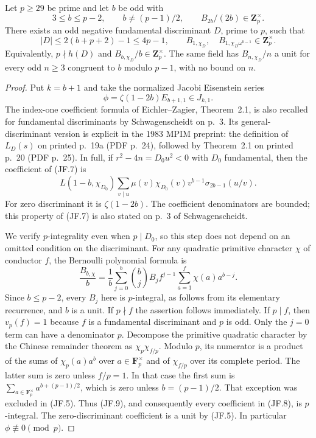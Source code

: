 \begin{theorem}
Let $p\geq29$ be prime and let $b$ be odd with
\[
 3\leq b\leq p-2,\qquad b\ne(p-1)/2,
 \qquad B_{2b}/(2b)\in\mathbf Z_p^\times.               \tag{JF.5}
\]
There exists an odd negative fundamental discriminant $D$, prime to
$p$, such that
\[
 |D|\leq2(b+p+2)-1\leq4p-1,\qquad
 B_{1,\chi_D},\quad B_{1,\chi_D\omega^{b-1}}
                      \in\mathbf Z_p^\times.           \tag{JF.6}
\]
Equivalently, $p\nmid h(D)$ and
$B_{b,\chi_D}/b\in\mathbf Z_p^\times$.
The same field has $B_{n,\chi_D}/n$ a unit for every odd $n\geq3$
congruent to $b$ modulo $p-1$, with no bound on $n$.
\end{theorem}
\begin{proof}
Put $k=b+1$ and take the normalized Jacobi Eisenstein series
\[
                \phi=\zeta(1-2b)E_{b+1,1}\in J_{k,1}.
                                                               \tag{JF.7}
\]
The index-one coefficient formula of Eichler--Zagier, Theorem~2.1,
is also recalled for fundamental discriminants by Schwagenscheidt
on p.~3.  Its general-discriminant version is explicit in the
1983 MPIM preprint: the definition of $L_D(s)$ on printed p.~19a
(PDF p.~24), followed by Theorem~2.1 on printed p.~20 (PDF p.~25).
In full, if $r^2-4n=D_0u^2<0$ with $D_0$ fundamental,
then the coefficient of (JF.7) is
\[
 L(1-b,\chi_{D_0})
 \sum_{v\mid u}\mu(v)\chi_{D_0}(v)v^{b-1}
                      \sigma_{2b-1}(u/v).               \tag{JF.8}
\]
For zero discriminant it is $\zeta(1-2b)$.
The coefficient denominators are bounded; this property of (JF.7)
is also stated on p.~3 of Schwagenscheidt.

We verify $p$-integrality even when $p\mid D_0$, so this step does
not depend on an omitted condition on the discriminant.  For any
quadratic primitive character $\chi$ of conductor $f$, the Bernoulli
polynomial formula is
\[
 \frac{B_{b,\chi}}b
 =\frac1b\sum_{j=0}^{b}\binom bj B_j f^{j-1}
                     \sum_{a=1}^{f}\chi(a)a^{b-j}.       \tag{JF.9}
\]
Since $b\leq p-2$, every $B_j$ here is $p$-integral, as follows
from its elementary recurrence, and $b$ is a unit.  If $p\nmid f$
the assertion follows immediately.  If $p\mid f$, then $v_p(f)=1$
because $f$ is a fundamental discriminant and $p$ is odd.
Only the $j=0$ term can have a denominator $p$.  Decompose the
primitive quadratic character by the Chinese remainder theorem
as $\chi_p\chi_{f/p}$.  Modulo $p$, its numerator is a product
of the sums of $\chi_p(a)a^b$ over $a\in\mathbf F_p^\times$
and of $\chi_{f/p}$ over its complete period.  The latter sum is
zero unless $f/p=1$.  In that case the first sum is
$\sum_{a\in\mathbf F_p^\times}a^{b+(p-1)/2}$, which is zero
unless $b=(p-1)/2$.  That exception was excluded in (JF.5).
Thus (JF.9), and consequently every coefficient in (JF.8), is
$p$-integral.  The zero-discriminant coefficient is a unit by (JF.5).
In particular $\phi\not\equiv0\pmod p$.


\end{proof}
